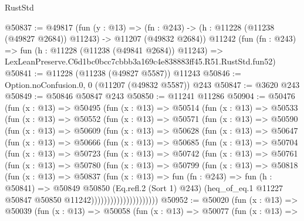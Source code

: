 \begin{lexlean}{RustStd}
\begin{coremodule}
@50837 := @49817
    (fun (y : @13) =>
    (fn : @243) -> (h : @11228 (@11238 (@49827 @2684)) @11243) -> @11207 (@49832 @2684))
    @11242
    (fun (fn : @243) =>
    fun (h : @11228 (@11238 (@49841 @2684)) @11243) =>
    LexLeanPreserve.C6d1bc0bcc7cbbb3a169c4e838883ff45.R51.RustStd.fun52)
@50841 := @11228 (@11238 (@49827 @5587)) @11243
@50846 := Option.noConfusion.{0, 0} (@11207 (@49832 @5587)) @243
@50847 := @3620 @243
@50849 := @50846 @50847 @243
@50850 := @11241 @11286
@50904 := @50476
    (fun (x : @13) =>
    @50495
      (fun (x : @13) =>
      @50514
        (fun (x : @13) =>
        @50533
          (fun (x : @13) =>
          @50552
            (fun (x : @13) =>
            @50571
              (fun (x : @13) =>
              @50590
                (fun (x : @13) =>
                @50609
                  (fun (x : @13) =>
                  @50628
                    (fun (x : @13) =>
                    @50647
                      (fun (x : @13) =>
                      @50666
                        (fun (x : @13) =>
                        @50685
                          (fun (x : @13) =>
                          @50704
                            (fun (x : @13) =>
                            @50723
                              (fun (x : @13) =>
                              @50742
                                (fun (x : @13) =>
                                @50761
                                  (fun (x : @13) =>
                                  @50780
                                    (fun (x : @13) =>
                                    @50799
                                      (fun (x : @13) =>
                                      @50818
                                        (fun (x : @13) =>
                                        @50837
                                          (fun (x : @13) =>
                                          fun (fn : @243) =>
                                          fun (h : @50841) =>
                                          @50849
                                            @50850
                                            (Eq.refl.{2} (Sort 1) @243)
                                            (heq_of_eq.{1}
                                              @11227
                                              @50847
                                              @50850
                                              @11242)))))))))))))))))))))
@50952 := @50020
    (fun (x : @13) =>
    @50039
      (fun (x : @13) =>
      @50058
        (fun (x : @13) =>
        @50077
          (fun (x : @13) =>

\end{coremodule}
\end{lexlean}
